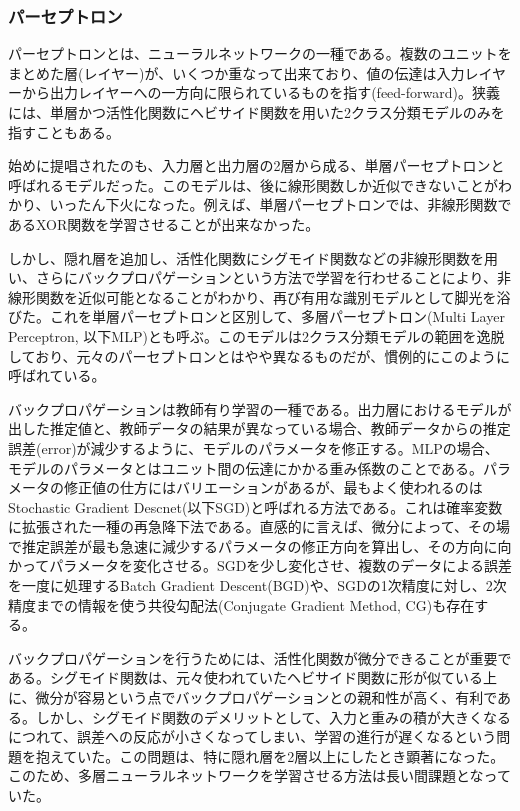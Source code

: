 \subsubsection{パーセプトロン}
パーセプトロンとは、ニューラルネットワークの一種である。複数のユニットをまとめた層(レイヤー)が、いくつか重なって出来ており、値の伝達は入力レイヤーから出力レイヤーへの一方向に限られているものを指す(feed-forward)。狭義には、単層かつ活性化関数にヘビサイド関数を用いた2クラス分類モデルのみを指すこともある。\par
始めに提唱されたのも、入力層と出力層の2層から成る、単層パーセプトロンと呼ばれるモデルだった\cite{rosenblatt1958perceptron}。このモデルは、後に線形関数しか近似できないことがわかり、いったん下火になった\cite{minsky1988perceptrons:}。例えば、単層パーセプトロンでは、非線形関数であるXOR関数を学習させることが出来なかった。\par
しかし、隠れ層を追加し、活性化関数にシグモイド関数などの非線形関数を用い、さらにバックプロパゲーションという方法で学習を行わせることにより、非線形関数を近似可能となることがわかり、再び有用な識別モデルとして脚光を浴びた\cite{rumelhart1986learning}\cite{funahashi1989on-the-approximate}。これを単層パーセプトロンと区別して、多層パーセプトロン(Multi Layer Perceptron, 以下MLP)とも呼ぶ。このモデルは2クラス分類モデルの範囲を逸脱しており、元々のパーセプトロンとはやや異なるものだが、慣例的にこのように呼ばれている。\par
バックプロパゲーションは教師有り学習の一種である。出力層におけるモデルが出した推定値と、教師データの結果が異なっている場合、教師データからの推定誤差(error)が減少するように、モデルのパラメータを修正する。MLPの場合、モデルのパラメータとはユニット間の伝達にかかる重み係数のことである。パラメータの修正値の仕方にはバリエーションがあるが、最もよく使われるのはStochastic Gradient Descnet(以下SGD)と呼ばれる方法である。これは確率変数に拡張された一種の再急降下法である。直感的に言えば、微分によって、その場で推定誤差が最も急速に減少するパラメータの修正方向を算出し、その方向に向かってパラメータを変化させる。SGDを少し変化させ、複数のデータによる誤差を一度に処理するBatch Gradient Descent(BGD)や、SGDの1次精度に対し、2次精度までの情報を使う共役勾配法(Conjugate Gradient Method, CG)も存在する。\par
バックプロパゲーションを行うためには、活性化関数が微分できることが重要である。シグモイド関数は、元々使われていたヘビサイド関数に形が似ている上に、微分が容易という点でバックプロパゲーションとの親和性が高く、有利である。しかし、シグモイド関数のデメリットとして、入力と重みの積が大きくなるにつれて、誤差への反応が小さくなってしまい、学習の進行が遅くなるという問題を抱えていた。この問題は、特に隠れ層を2層以上にしたとき顕著になった。このため、多層ニューラルネットワークを学習させる方法は長い間課題となっていた。